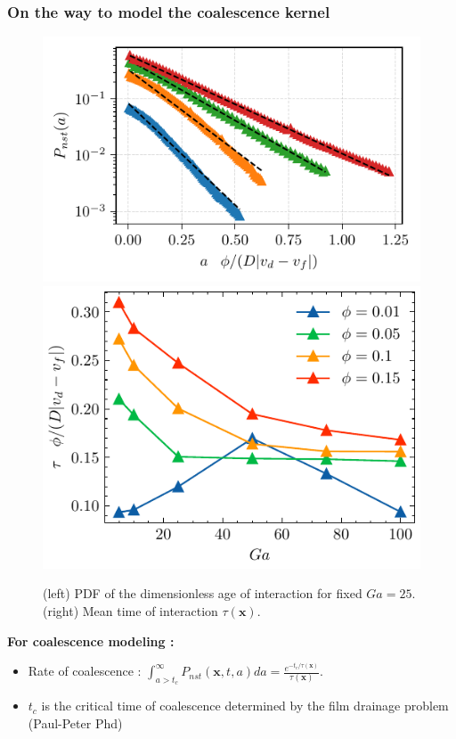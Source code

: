 \documentclass{sintefbeamer}
\begin{document}
\begin{frame}
  \frametitle{On the way to model the coalescence kernel}
    \begin{figure}
        \includegraphics[height=0.23\textwidth]{image/HOMOGENEOUS/fDrop/P_a_Ga_25.pdf}
        \includegraphics[height=0.23\textwidth]{image/HOMOGENEOUS/fPA/ageGa.pdf}
        \caption{ (left) PDF of the dimensionless age of interaction for fixed $Ga = 25$.
      (right) Mean time of interaction $\tau(\textbf{x})$.}
    \end{figure}
  \textbf{For coalescence modeling : }
\begin{itemize}
  \item Rate of coalescence : $\int_{a > t_c}^\infty P_{nst}(\textbf{x},t,a) da 
  = \frac{e^{-t_c/\tau(\textbf{x})}}{\tau(\textbf{x})}$. 
  \item $t_c$ is the critical time of coalescence determined by the film drainage problem (Paul-Peter Phd)
\end{itemize}

\end{frame}





\section*{}
\end{document}
